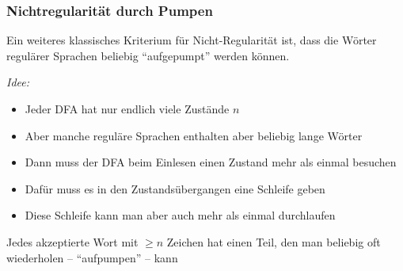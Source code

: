 \documentclass[onlymath]{beamer}
\begin{document}
% 
% 

\newcommand{\colstackrel}[3]{\,{\stackrel{\textcolor{#3}{#1}}{\textcolor{#3}{#2}}}\,}
\newcommand{\gstackrel}[2]{\colstackrel{#1}{#2}{darkgreen}}
\newcommand{\bstackrel}[2]{\colstackrel{#1}{#2}{darkblue}}
\newcommand{\rstackrel}[2]{\colstackrel{#1}{#2}{darkred}}

\begin{frame}\frametitle{Nichtregularität durch Pumpen}

Ein weiteres klassisches Kriterium für Nicht-Regularität ist, dass die Wörter regulärer Sprachen
beliebig "`aufgepumpt"' werden können.
\bigskip

\emph{Idee:}
\begin{itemize}
\item Jeder DFA hat nur endlich viele Zustände $n$
\item Aber manche reguläre Sprachen enthalten aber beliebig lange Wörter
\end{itemize}
\pause
% 
\begin{itemize}
\item Dann muss der DFA beim Einlesen einen Zustand mehr als einmal besuchen
\item Dafür muss es in den Zustandsübergangen eine Schleife geben
\item Diese Schleife kann man aber auch mehr als einmal durchlaufen
% 
\end{itemize}\pause

\begin{center}
\alert{Jedes akzeptierte Wort mit $\geq n$ Zeichen hat einen Teil, den man beliebig oft wiederholen -- "`aufpumpen"' -- kann}
\end{center}

\end{frame}
\end{document}
